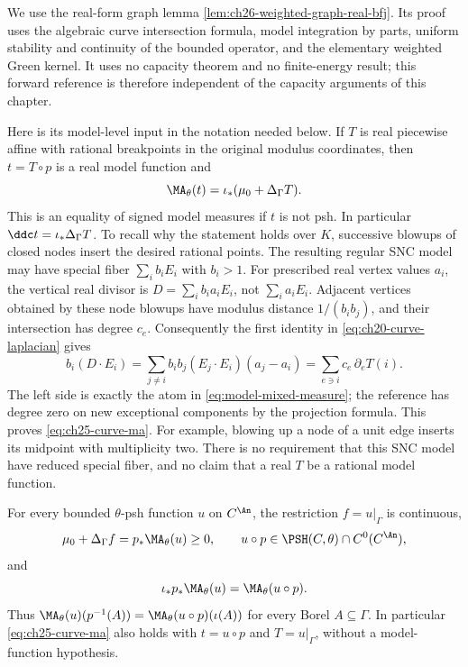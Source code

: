 We use the real-form graph lemma
\cref{lem:ch26-weighted-graph-real-bfj}.  Its proof uses the algebraic
curve intersection formula, model integration by parts, uniform
stability and continuity of the bounded operator, and the elementary
weighted Green kernel.  It uses no capacity theorem and no
finite-energy result; this forward reference is therefore independent
of the capacity arguments of this chapter.

Here is its model-level input in the notation needed below.  If \(T\)
is real piecewise affine with rational breakpoints in the original
modulus coordinates, then \(t=T\circ p\) is a real model function and
\begin{equation}
\label{eq:ch25-curve-ma}
 \MA_\theta(t)=\iota_*(\mu_0+\Delta_\Gamma T).
\end{equation}
This is an equality of signed model measures if \(t\) is not psh.
In particular \(\ddc t=\iota_*\Delta_\Gamma T\).  To recall why the
statement holds over \(K\), successive blowups of closed nodes insert
the desired rational points.  The resulting regular SNC model may
have special fiber \(\sum_i b_iE_i\) with \(b_i>1\).
For prescribed real vertex values \(a_i\), the vertical real divisor
is \(D=\sum_i b_i a_iE_i\), not \(\sum_i a_iE_i\).
Adjacent vertices obtained by these node blowups have modulus
distance \(1/(b_i b_j)\), and their intersection has degree \(c_e\).
Consequently the first identity in
\eqref{eq:ch20-curve-laplacian} gives
\[
 b_i(D\cdot E_i)
   =\sum_{j\ne i}b_i b_j(E_j\cdot E_i)(a_j-a_i)
   =\sum_{e\ni i}c_e\,\partial_eT(i).
\]
The left side is exactly the atom in
\eqref{eq:model-mixed-measure}; the reference has degree zero on
new exceptional components by the projection formula.  This proves
\eqref{eq:ch25-curve-ma}.  For example, blowing up a node of a unit
edge inserts its midpoint with multiplicity two.  There is no
requirement that this SNC model have reduced special fiber, and no
claim that a real \(T\) be a rational model function.

\begin{proposition}
\label{prop:ch25-curve-pushforward}
For every bounded \(\theta\)-psh function \(u\) on \(C^{\An}\), the
restriction \(f=u|_\Gamma\) is continuous,
\[
 \mu_0+\Delta_\Gamma f=p_*\MA_\theta(u)\geq0,
 \qquad u\circ p\in\PSH(C,\theta)\cap C^0(C^{\An}),
\]
and
\begin{equation}
\label{eq:ch25-curve-pushforward}
 \iota_*p_*\MA_\theta(u)=\MA_\theta(u\circ p).
\end{equation}
Thus \(\MA_\theta(u)(p^{-1}(A))
=\MA_\theta(u\circ p)(\iota(A))\) for every Borel
\(A\subseteq\Gamma\).  In particular
\eqref{eq:ch25-curve-ma} also holds with \(t=u\circ p\) and
\(T=u|_\Gamma\), without a model-function hypothesis.
\end{proposition}

